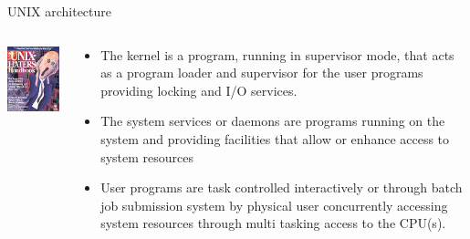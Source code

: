 \documentclass[unknownkeysallowed, 10pt, a4 paper, handout]{beamer}
\begin{document}
\begin{frame}[label=architecture]{UNIX architecture}
  \begin{columns}[T]
    \begin{column}{.23\textwidth}
      \includegraphics[scale=0.5]{pics/UNIX-HATERS_Handbook_cover_ISBN_1-56884-203-1.png}
    \end{column}
    \begin{column}{.73\textwidth}
      \begin{itemize}
      \item The kernel is a program, running in supervisor mode, that acts as a
        program loader and supervisor for the user programs providing locking
        and I/O services.
      \item The system services or daemons are programs running on the system
        and providing facilities that allow or enhance access to system
        resources
      \item User programs are task controlled interactively or through batch job
        submission system by physical user concurrently accessing system
        resources through multi tasking access to the CPU(s).
    \end{itemize}
    \end{column}
  \end{columns}
\end{frame}


\end{document}
